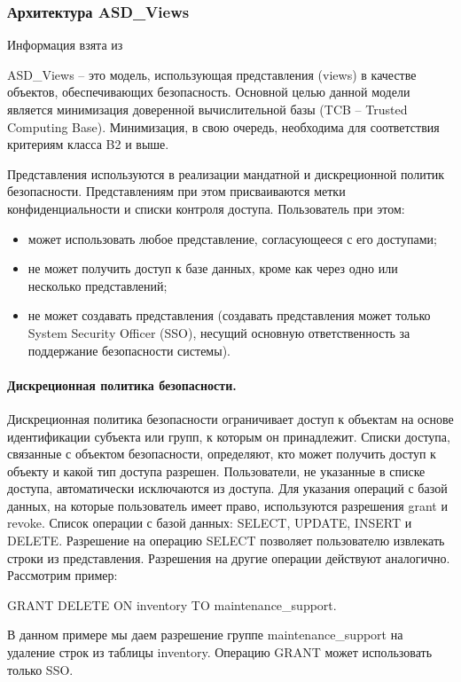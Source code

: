 \subsubsection{Архитектура ASD\_Views}

Информация взята из \autocite{ASDViews}

ASD\_Views –  это модель, использующая представления (views) в качестве объектов, обеспечивающих безопасность. 
Основной целью данной модели является минимизация доверенной вычислительной базы (TCB – Trusted Computing Base). 
Минимизация, в свою очередь, необходима для соответствия критериям класса B2 и выше.

Представления используются в реализации мандатной и дискреционной политик безопасности. 
Представлениям при этом присваиваются метки конфиденциальности и списки контроля доступа. Пользователь при этом:
\begin{itemize}
    \item может использовать любое представление, согласующееся с его доступами;
    \item не может получить доступ к базе данных, кроме как через одно или несколько представлений;
    \item не может создавать представления (создавать представления может только System Security Officer (SSO), 
    несущий основную ответственность за поддержание безопасности системы).
\end{itemize}

\paragraph{Дискреционная политика безопасности.}

Дискреционная политика безопасности ограничивает доступ к объектам на основе идентификации субъекта или групп, 
к которым он принадлежит. Списки доступа, связанные с объектом безопасности, определяют, 
кто может получить доступ к объекту и какой тип доступа разрешен. Пользователи, не указанные в списке доступа, 
автоматически исключаются из доступа. Для указания операций с базой данных, на которые пользователь имеет право, 
используются разрешения grant и revoke. Список операции с базой данных: SELECT, UPDATE, INSERT и DELETE. 
Разрешение на операцию SELECT позволяет пользователю извлекать строки из представления. 
Разрешения на другие операции действуют аналогично. Рассмотрим пример:
\begin{center}
    GRANT DELETE ON inventory TO maintenance\_support.
\end{center}
В данном примере мы даем разрешение группе maintenance\_support на удаление строк из таблицы inventory. 
Операцию GRANT может использовать только SSO.

